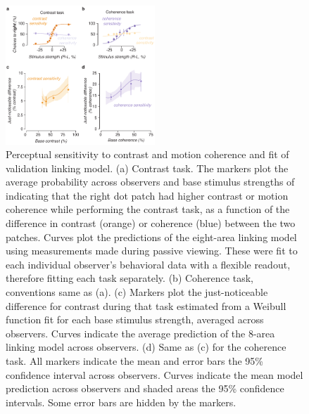 \documentclass{report}
\begin{document}
\begin{figure}
\centering
\includegraphics[keepaspectratio,width=0.5\textwidth]{figs_c2/Fig2_behav.pdf}
\caption[Perceptual sensitivity to contrast and motion coherence and fit of validation linking model]{Perceptual sensitivity to contrast and motion coherence and fit of validation linking model. (a) Contrast task. The markers plot the average probability across observers and base stimulus strengths of indicating that the right dot patch had higher contrast or motion coherence while performing the contrast task, as a function of the difference in contrast (orange) or coherence (blue) between the two patches. Curves plot the predictions of the eight-area linking model using measurements made during passive viewing. These were fit to each individual observer’s behavioral data with a flexible readout, therefore fitting each task separately. (b) Coherence task, conventions same as (a). (c) Markers plot the just-noticeable difference for contrast during that task estimated from a Weibull function fit for each base stimulus strength, averaged across observers. Curves indicate the average prediction of the 8-area linking model across observers. (d) Same as (c) for the coherence task. All markers indicate the mean and error bars the 95\% confidence interval across observers. Curves indicate the mean model prediction across observers and shaded areas the 95\% confidence intervals. Some error bars are hidden by the markers.}
\label{fig:c4f2}
\end{figure}
\end{document}
